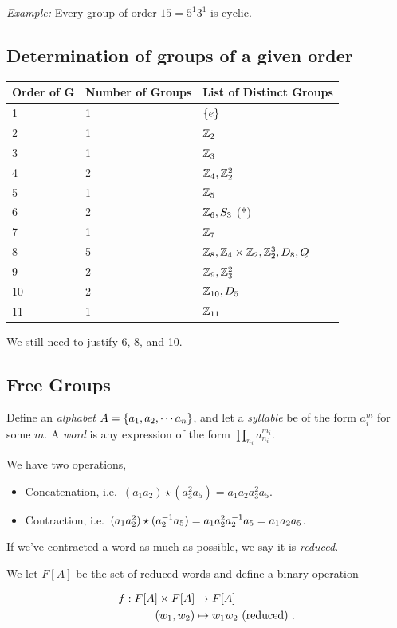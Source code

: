 \emph{Example:} Every group of order \(15 = 5^1 3^1\) is cyclic.

\hypertarget{determination-of-groups-of-a-given-order}{%
\subsection{Determination of groups of a given
order}\label{determination-of-groups-of-a-given-order}}

\begin{longtable}[]{@{}lll@{}}
\toprule
Order of G & Number of Groups & List of Distinct Groups\tabularnewline
\midrule
\endhead
1 & 1 & \(\left\{{e}\right\}\)\tabularnewline
2 & 1 & \({\mathbb{Z}}_2\)\tabularnewline
3 & 1 & \({\mathbb{Z}}_3\)\tabularnewline
4 & 2 & \({\mathbb{Z}}_4, {\mathbb{Z}}_2^2\)\tabularnewline
5 & 1 & \({\mathbb{Z}}_5\)\tabularnewline
6 & 2 & \({\mathbb{Z}}_6, S_3\) (*)\tabularnewline
7 & 1 & \({\mathbb{Z}}_7\)\tabularnewline
8 & 5 & \({\mathbb{Z}}_8,{\mathbb{Z}}_4 \times {\mathbb{Z}}_2, {\mathbb{Z}}_2^3, D_8,Q\)\tabularnewline
9 & 2 & \({\mathbb{Z}}_9, {\mathbb{Z}}_3^2\)\tabularnewline
10 & 2 & \({\mathbb{Z}}_{10}, D_5\)\tabularnewline
11 & 1 & \({\mathbb{Z}}_{11}\)\tabularnewline
\bottomrule
\end{longtable}

We still need to justify 6, 8, and 10.

\hypertarget{free-groups}{%
\subsection{Free Groups}\label{free-groups}}

Define an \emph{alphabet} \(A = \left\{{a_1, a_2, \cdots a_n}\right\}\), and let
a \emph{syllable} be of the form \(a_i^m\) for some \(m\). A \emph{word}
is any expression of the form \(\prod_{n_i} a_{n_i}^{m_i}\).

We have two operations,

\begin{itemize}
\item
  Concatenation,
  i.e.~\((a_1 a_2) \star (a_3^2 a_5) = a_1 a_2 a_3^2 a_5\).
\item
  Contraction,
  i.e.~\((a_1 a_2^2) \star (a_2^{-1} a_5) = a_1 a_2^2 a_2^{-1} a_5 = a_1 a_2 a_5\).
\end{itemize}

If we've contracted a word as much as possible, we say it is
\emph{reduced}.

We let \(F[A]\) be the set of reduced words and define a binary
operation

\begin{align*}
f: F[A] \times F[A] &\to F[A] \\
(w_1, w_2) &\mapsto w_1 w_2 \text{ (reduced) }
.\end{align*}

